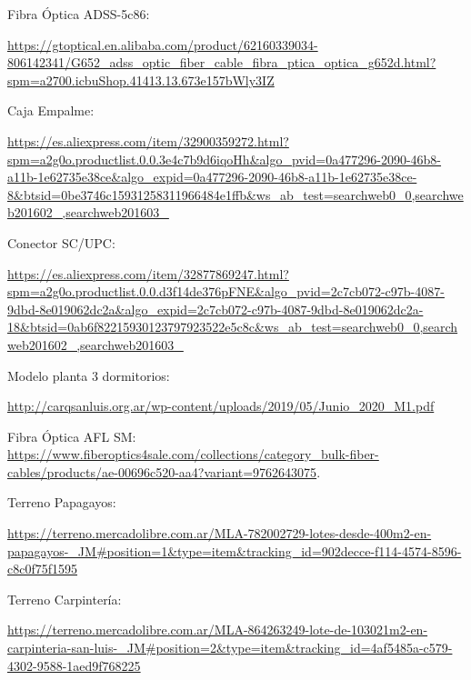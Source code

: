 \begin{thebibliography}{99}


Fibra Óptica ADSS-5c86: \begin{tiny}
\url{https://gtoptical.en.alibaba.com/product/62160339034-806142341/G652_adss_optic_fiber_cable_fibra_ptica_optica_g652d.html?spm=a2700.icbuShop.41413.13.673e157bWly3IZ}
\end{tiny}



Caja Empalme: \begin{tiny}
\url{https://es.aliexpress.com/item/32900359272.html?spm=a2g0o.productlist.0.0.3e4c7b9d6iqoHh&algo_pvid=0a477296-2090-46b8-a11b-1e62735e38ce&algo_expid=0a477296-2090-46b8-a11b-1e62735e38ce-8&btsid=0be3746c15931258311966484e1ffb&ws_ab_test=searchweb0_0,searchweb201602_,searchweb201603_}
\end{tiny}



Conector SC/UPC: \begin{tiny}
\url{https://es.aliexpress.com/item/32877869247.html?spm=a2g0o.productlist.0.0.d3f14de376pFNE&algo_pvid=2c7cb072-c97b-4087-9dbd-8e019062dc2a&algo_expid=2c7cb072-c97b-4087-9dbd-8e019062dc2a-18&btsid=0ab6f82215930123797923522e5c8c&ws_ab_test=searchweb0_0,searchweb201602_,searchweb201603_}
\end{tiny}



Modelo planta 3 dormitorios: \begin{tiny}
\url{http://carqsanluis.org.ar/wp-content/uploads/2019/05/Junio_2020_M1.pdf}\end{tiny}


 Fibra Óptica AFL SM: \url{https://www.fiberoptics4sale.com/collections/category_bulk-fiber-cables/products/ae-00696c520-aa4?variant=9762643075}.

Terreno Papagayos: \begin{tiny}
\url{https://terreno.mercadolibre.com.ar/MLA-782002729-lotes-desde-400m2-en-papagayos-_JM#position=1&type=item&tracking_id=902decce-f114-4574-8596-c8c0f75f1595}
\end{tiny}

Terreno Carpintería: \begin{tiny}
\url{https://terreno.mercadolibre.com.ar/MLA-864263249-lote-de-103021m2-en-carpinteria-san-luis-_JM#position=2&type=item&tracking_id=4af5485a-c579-4302-9588-1aed9f768225}
\end{tiny}



\end{thebibliography}
